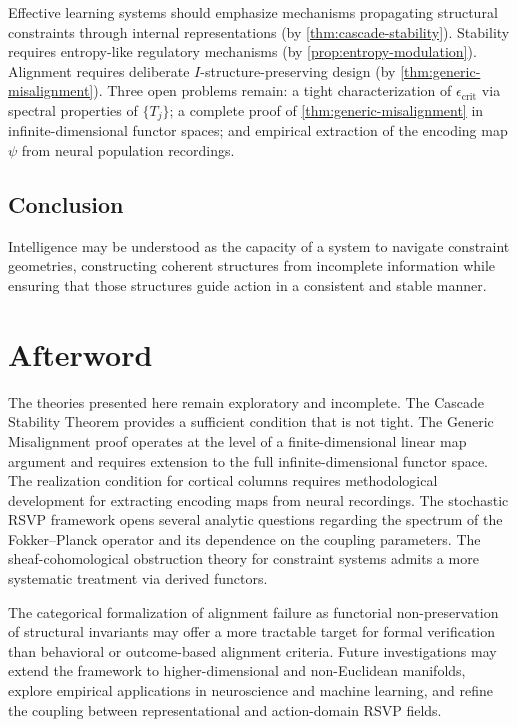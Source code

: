 \documentclass[12pt,a4paper,oneside]{book}
\numberwithin{equation}{chapter}
\theoremstyle{plain}
\theoremstyle{definition}
\theoremstyle{remark}
\begin{document}
Effective learning systems should emphasize mechanisms propagating
structural constraints through internal representations (by
\cref{thm:cascade-stability}). Stability requires entropy-like
regulatory mechanisms (by \cref{prop:entropy-modulation}).
Alignment requires deliberate $I$-structure-preserving design (by
\cref{thm:generic-misalignment}). Three open problems remain: a tight
characterization of $\epsilon_\mathrm{crit}$ via spectral properties
of $\{T_j\}$; a complete proof of \cref{thm:generic-misalignment} in
infinite-dimensional functor spaces; and empirical extraction of the
encoding map $\psi$ from neural population recordings.

\section{Conclusion}

Intelligence may be understood as the capacity of a system to navigate
constraint geometries, constructing coherent structures from incomplete
information while ensuring that those structures guide action in a
consistent and stable manner.

\backmatter

\chapter*{Afterword}

The theories presented here remain exploratory and incomplete. The
Cascade Stability Theorem provides a sufficient condition that is not
tight. The Generic Misalignment proof operates at the level of a
finite-dimensional linear map argument and requires extension to the
full infinite-dimensional functor space. The realization condition for
cortical columns requires methodological development for extracting
encoding maps from neural recordings. The stochastic RSVP framework
opens several analytic questions regarding the spectrum of the
Fokker--Planck operator and its dependence on the coupling parameters.
The sheaf-cohomological obstruction theory for constraint systems
admits a more systematic treatment via derived functors.

The categorical formalization of alignment failure as functorial
non-preservation of structural invariants may offer a more tractable
target for formal verification than behavioral or outcome-based
alignment criteria. Future investigations may extend the framework to
higher-dimensional and non-Euclidean manifolds, explore empirical
applications in neuroscience and machine learning, and refine the
coupling between representational and action-domain RSVP fields.
\end{document}
